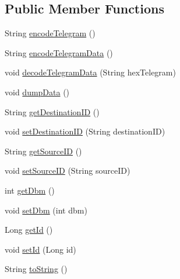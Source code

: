\subsection*{Public Member Functions}
\begin{DoxyCompactItemize}
\item 
String \hyperlink{classch_1_1bfh_1_1gr33nopo55um_1_1enocean_1_1telegram_1_1_radio_message_ac1d3f61c4242953828f132de6c7595f3}{encode\+Telegram} ()
\item 
String \hyperlink{classch_1_1bfh_1_1gr33nopo55um_1_1enocean_1_1telegram_1_1_radio_message_af0c883d403a7500296a6f2e8f720308d}{encode\+Telegram\+Data} ()
\item 
void \hyperlink{classch_1_1bfh_1_1gr33nopo55um_1_1enocean_1_1telegram_1_1_radio_message_a452e81a42c7eae0906b27881e3034b83}{decode\+Telegram\+Data} (String hex\+Telegram)
\item 
void \hyperlink{classch_1_1bfh_1_1gr33nopo55um_1_1enocean_1_1telegram_1_1_radio_message_aaddde18bd4e2f9243346bb3482fb5643}{dump\+Data} ()
\item 
String \hyperlink{classch_1_1bfh_1_1gr33nopo55um_1_1enocean_1_1telegram_1_1_radio_message_a677622fcad169f2139dd34a83ddce8ec}{get\+Destination\+ID} ()
\item 
void \hyperlink{classch_1_1bfh_1_1gr33nopo55um_1_1enocean_1_1telegram_1_1_radio_message_a5ef09eb0c1963fe42cfd3605aca570ba}{set\+Destination\+ID} (String destination\+ID)
\item 
String \hyperlink{classch_1_1bfh_1_1gr33nopo55um_1_1enocean_1_1telegram_1_1_radio_message_a36317b316621f8eed3345674f1dd84c0}{get\+Source\+ID} ()
\item 
void \hyperlink{classch_1_1bfh_1_1gr33nopo55um_1_1enocean_1_1telegram_1_1_radio_message_a9f14973ca97eecf23d30f8e63d4ae83f}{set\+Source\+ID} (String source\+ID)
\item 
int \hyperlink{classch_1_1bfh_1_1gr33nopo55um_1_1enocean_1_1telegram_1_1_radio_message_a017f82807dd2b9218b500992396d0429}{get\+Dbm} ()
\item 
void \hyperlink{classch_1_1bfh_1_1gr33nopo55um_1_1enocean_1_1telegram_1_1_radio_message_a7df7761cd18025a842c4796e0fbaea02}{set\+Dbm} (int dbm)
\item 
Long \hyperlink{classch_1_1bfh_1_1gr33nopo55um_1_1enocean_1_1telegram_1_1_radio_message_a4d3e0c50ad97b6628092c1cb1ce78be6}{get\+Id} ()
\item 
void \hyperlink{classch_1_1bfh_1_1gr33nopo55um_1_1enocean_1_1telegram_1_1_radio_message_a52fe9b52ec3414770a89f1f82c3bdf81}{set\+Id} (Long id)
\item 
String \hyperlink{classch_1_1bfh_1_1gr33nopo55um_1_1enocean_1_1telegram_1_1_radio_message_af8e045ec1e5c0abe833d31b807977fed}{to\+String} ()
\end{DoxyCompactItemize}


